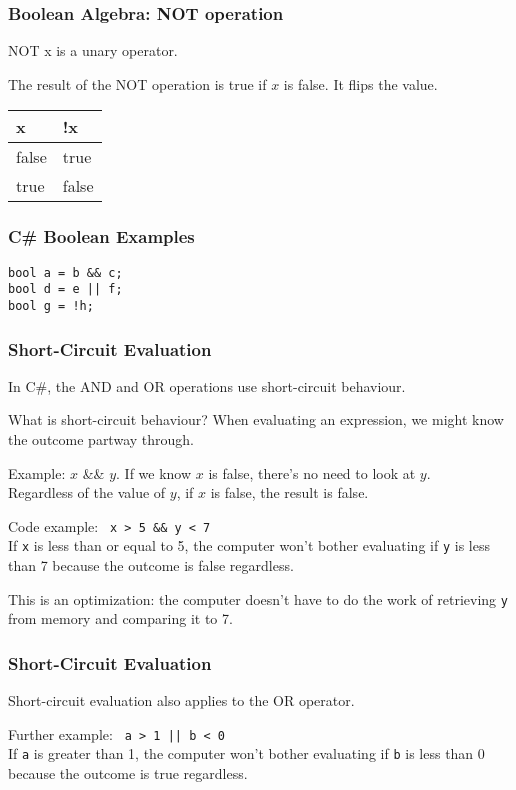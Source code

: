 \begin{frame}
\frametitle{Boolean Algebra: NOT operation}

NOT x is a unary operator.

The result of the NOT operation is true if $x$ is false. It flips the value.

\begin{center}
\begin{tabular}{l|l}
	\textbf{x} & \textbf{!x}\\ \hline
	false & true \\ \hline
	true & false \\ 
\end{tabular}
\end{center}

\end{frame}


\begin{frame}
\frametitle{C\# Boolean Examples}


\texttt{bool a = b \&\& c;}\\
\texttt{bool d = e || f;}\\
\texttt{bool g = !h;}

\end{frame}

\begin{frame}
\frametitle{Short-Circuit Evaluation}
In C\#, the AND and OR operations use \alert{short-circuit} behaviour.

What is short-circuit behaviour? When evaluating an expression, we might know the outcome partway through.

Example: $x$ \&\& $y$. If we know $x$ is false, there's no need to look at $y$.\\
\quad Regardless of the value of $y$, if $x$ is false, the result is false.

Code example: \texttt{ x > 5 \&\& y < 7 }\\
If \texttt{x} is less than or equal to 5, the computer won't bother evaluating if \texttt{y} is less than 7 because the outcome is false regardless.

This is an optimization: the computer doesn't have to do the work of retrieving \texttt{y} from memory and comparing it to 7.

\end{frame}

\begin{frame}
\frametitle{Short-Circuit Evaluation}

Short-circuit evaluation also applies to the OR operator.

Further example: \texttt{ a > 1 || b < 0 }\\
If \texttt{a} is greater than 1, the computer won't bother evaluating if \texttt{b} is less than 0 because the outcome is true regardless.

\end{frame}

